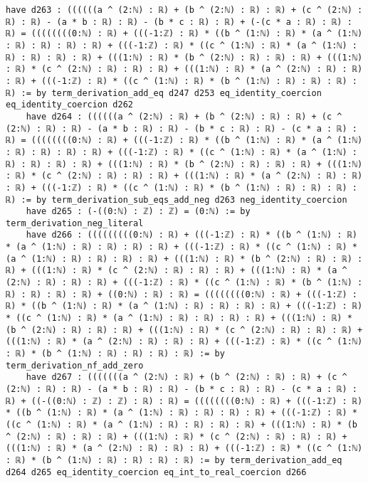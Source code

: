 \documentclass{article}
\begin{document}
\begin{tcolorbox}[colback=white!10, width=\linewidth]
\begin{lstlisting}[language=Lean4]
    have d263 : ((((((a ^ (2:ℕ) : ℝ) + (b ^ (2:ℕ) : ℝ) : ℝ) + (c ^ (2:ℕ) : ℝ) : ℝ) - (a * b : ℝ) : ℝ) - (b * c : ℝ) : ℝ) + (-(c * a : ℝ) : ℝ) : ℝ) = ((((((((0:ℕ) : ℝ) + (((-1:ℤ) : ℝ) * ((b ^ (1:ℕ) : ℝ) * (a ^ (1:ℕ) : ℝ) : ℝ) : ℝ) : ℝ) + (((-1:ℤ) : ℝ) * ((c ^ (1:ℕ) : ℝ) * (a ^ (1:ℕ) : ℝ) : ℝ) : ℝ) : ℝ) + (((1:ℕ) : ℝ) * (b ^ (2:ℕ) : ℝ) : ℝ) : ℝ) + (((1:ℕ) : ℝ) * (c ^ (2:ℕ) : ℝ) : ℝ) : ℝ) + (((1:ℕ) : ℝ) * (a ^ (2:ℕ) : ℝ) : ℝ) : ℝ) + (((-1:ℤ) : ℝ) * ((c ^ (1:ℕ) : ℝ) * (b ^ (1:ℕ) : ℝ) : ℝ) : ℝ) : ℝ) := by term_derivation_add_eq d247 d253 eq_identity_coercion eq_identity_coercion d262
    have d264 : ((((((a ^ (2:ℕ) : ℝ) + (b ^ (2:ℕ) : ℝ) : ℝ) + (c ^ (2:ℕ) : ℝ) : ℝ) - (a * b : ℝ) : ℝ) - (b * c : ℝ) : ℝ) - (c * a : ℝ) : ℝ) = ((((((((0:ℕ) : ℝ) + (((-1:ℤ) : ℝ) * ((b ^ (1:ℕ) : ℝ) * (a ^ (1:ℕ) : ℝ) : ℝ) : ℝ) : ℝ) + (((-1:ℤ) : ℝ) * ((c ^ (1:ℕ) : ℝ) * (a ^ (1:ℕ) : ℝ) : ℝ) : ℝ) : ℝ) + (((1:ℕ) : ℝ) * (b ^ (2:ℕ) : ℝ) : ℝ) : ℝ) + (((1:ℕ) : ℝ) * (c ^ (2:ℕ) : ℝ) : ℝ) : ℝ) + (((1:ℕ) : ℝ) * (a ^ (2:ℕ) : ℝ) : ℝ) : ℝ) + (((-1:ℤ) : ℝ) * ((c ^ (1:ℕ) : ℝ) * (b ^ (1:ℕ) : ℝ) : ℝ) : ℝ) : ℝ) := by term_derivation_sub_eqs_add_neg d263 neg_identity_coercion
    have d265 : (-((0:ℕ) : ℤ) : ℤ) = (0:ℕ) := by term_derivation_neg_literal
    have d266 : (((((((((0:ℕ) : ℝ) + (((-1:ℤ) : ℝ) * ((b ^ (1:ℕ) : ℝ) * (a ^ (1:ℕ) : ℝ) : ℝ) : ℝ) : ℝ) + (((-1:ℤ) : ℝ) * ((c ^ (1:ℕ) : ℝ) * (a ^ (1:ℕ) : ℝ) : ℝ) : ℝ) : ℝ) + (((1:ℕ) : ℝ) * (b ^ (2:ℕ) : ℝ) : ℝ) : ℝ) + (((1:ℕ) : ℝ) * (c ^ (2:ℕ) : ℝ) : ℝ) : ℝ) + (((1:ℕ) : ℝ) * (a ^ (2:ℕ) : ℝ) : ℝ) : ℝ) + (((-1:ℤ) : ℝ) * ((c ^ (1:ℕ) : ℝ) * (b ^ (1:ℕ) : ℝ) : ℝ) : ℝ) : ℝ) + ((0:ℕ) : ℝ) : ℝ) = ((((((((0:ℕ) : ℝ) + (((-1:ℤ) : ℝ) * ((b ^ (1:ℕ) : ℝ) * (a ^ (1:ℕ) : ℝ) : ℝ) : ℝ) : ℝ) + (((-1:ℤ) : ℝ) * ((c ^ (1:ℕ) : ℝ) * (a ^ (1:ℕ) : ℝ) : ℝ) : ℝ) : ℝ) + (((1:ℕ) : ℝ) * (b ^ (2:ℕ) : ℝ) : ℝ) : ℝ) + (((1:ℕ) : ℝ) * (c ^ (2:ℕ) : ℝ) : ℝ) : ℝ) + (((1:ℕ) : ℝ) * (a ^ (2:ℕ) : ℝ) : ℝ) : ℝ) + (((-1:ℤ) : ℝ) * ((c ^ (1:ℕ) : ℝ) * (b ^ (1:ℕ) : ℝ) : ℝ) : ℝ) : ℝ) := by term_derivation_nf_add_zero
    have d267 : (((((((a ^ (2:ℕ) : ℝ) + (b ^ (2:ℕ) : ℝ) : ℝ) + (c ^ (2:ℕ) : ℝ) : ℝ) - (a * b : ℝ) : ℝ) - (b * c : ℝ) : ℝ) - (c * a : ℝ) : ℝ) + ((-((0:ℕ) : ℤ) : ℤ) : ℝ) : ℝ) = ((((((((0:ℕ) : ℝ) + (((-1:ℤ) : ℝ) * ((b ^ (1:ℕ) : ℝ) * (a ^ (1:ℕ) : ℝ) : ℝ) : ℝ) : ℝ) + (((-1:ℤ) : ℝ) * ((c ^ (1:ℕ) : ℝ) * (a ^ (1:ℕ) : ℝ) : ℝ) : ℝ) : ℝ) + (((1:ℕ) : ℝ) * (b ^ (2:ℕ) : ℝ) : ℝ) : ℝ) + (((1:ℕ) : ℝ) * (c ^ (2:ℕ) : ℝ) : ℝ) : ℝ) + (((1:ℕ) : ℝ) * (a ^ (2:ℕ) : ℝ) : ℝ) : ℝ) + (((-1:ℤ) : ℝ) * ((c ^ (1:ℕ) : ℝ) * (b ^ (1:ℕ) : ℝ) : ℝ) : ℝ) : ℝ) := by term_derivation_add_eq d264 d265 eq_identity_coercion eq_int_to_real_coercion d266

\end{lstlisting}
\end{tcolorbox}
\end{document}

